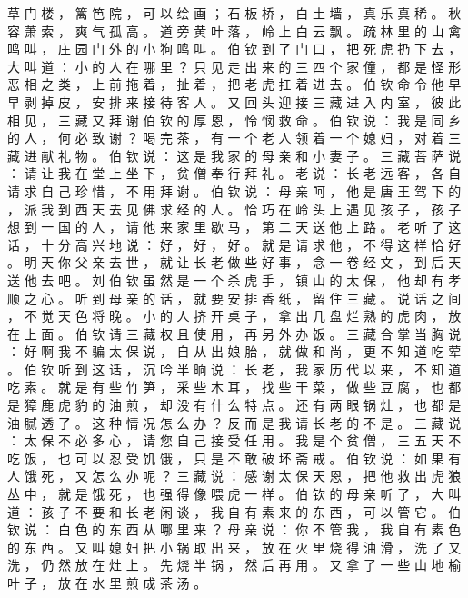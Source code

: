 {草 门 楼 ， 篱 笆 院 ， 可 以 绘 画 ； 石 板 桥 ， 白 土 墙 ， 真 乐 真 稀 。
秋 容 萧 索 ， 爽 气 孤 高 。
道 旁 黄 叶 落 ， 岭 上 白 云 飘 。
疏 林 里 的 山 禽 鸣 叫 ， 庄 园 门 外 的 小 狗 鸣 叫 。
伯 钦 到 了 门 口 ， 把 死 虎 扔 下 去 ， 大 叫 道 ： 小 的 人 在 哪 里 ？ 只 见 走 出 来 的 三 四 个 家 僮 ， 都 是 怪 形 恶 相 之 类 ， 上 前 拖 着 ， 扯 着 ， 把 老 虎 扛 着 进 去 。
伯 钦 命 令 他 早 早 剥 掉 皮 ， 安 排 来 接 待 客 人 。
又 回 头 迎 接 三 藏 进 入 内 室 ， 彼 此 相 见 ， 三 藏 又 拜 谢 伯 钦 的 厚 恩 ， 怜 悯 救 命 。
伯 钦 说 ： 我 是 同 乡 的 人 ， 何 必 致 谢 ？
喝 完 茶 ， 有 一 个 老 人 领 着 一 个 媳 妇 ， 对 着 三 藏 进 献 礼 物 。
伯 钦 说 ： 这 是 我 家 的 母 亲 和 小 妻 子 。
三 藏 菩 萨 说 ： 请 让 我 在 堂 上 坐 下 ， 贫 僧 奉 行 拜 礼 。
老 说 ： 长 老 远 客 ， 各 自 请 求 自 己 珍 惜 ， 不 用 拜 谢 。
伯 钦 说 ： 母 亲 呵 ， 他 是 唐 王 驾 下 的 ， 派 我 到 西 天 去 见 佛 求 经 的 人 。
恰 巧 在 岭 头 上 遇 见 孩 子 ， 孩 子 想 到 一 国 的 人 ， 请 他 来 家 里 歇 马 ， 第 二 天 送 他 上 路 。
老 听 了 这 话 ， 十 分 高 兴 地 说 ： 好 ， 好 ， 好 。
就 是 请 求 他 ， 不 得 这 样 恰 好 。
明 天 你 父 亲 去 世 ， 就 让 长 老 做 些 好 事 ， 念 一 卷 经 文 ， 到 后 天 送 他 去 吧 。
刘 伯 钦 虽 然 是 一 个 杀 虎 手 ， 镇 山 的 太 保 ， 他 却 有 孝 顺 之 心 。
听 到 母 亲 的 话 ， 就 要 安 排 香 纸 ， 留 住 三 藏 。
说 话 之 间 ， 不 觉 天 色 将 晚 。
小 的 人 挤 开 桌 子 ， 拿 出 几 盘 烂 熟 的 虎 肉 ， 放 在 上 面 。
伯 钦 请 三 藏 权 且 使 用 ， 再 另 外 办 饭 。
三 藏 合 掌 当 胸 说 ： 好 啊 我 不 骗 太 保 说 ， 自 从 出 娘 胎 ， 就 做 和 尚 ， 更 不 知 道 吃 荤 。
伯 钦 听 到 这 话 ， 沉 吟 半 晌 说 ： 长 老 ， 我 家 历 代 以 来 ， 不 知 道 吃 素 。
就 是 有 些 竹 笋 ， 采 些 木 耳 ， 找 些 干 菜 ， 做 些 豆 腐 ， 也 都 是 獐 鹿 虎 豹 的 油 煎 ， 却 没 有 什 么 特 点 。
还 有 两 眼 锅 灶 ， 也 都 是 油 腻 透 了 。
这 种 情 况 怎 么 办 ？ 反 而 是 我 请 长 老 的 不 是 。
三 藏 说 ： 太 保 不 必 多 心 ， 请 您 自 己 接 受 任 用 。
我 是 个 贫 僧 ， 三 五 天 不 吃 饭 ， 也 可 以 忍 受 饥 饿 ， 只 是 不 敢 破 坏 斋 戒 。
伯 钦 说 ： 如 果 有 人 饿 死 ， 又 怎 么 办 呢 ？ 三 藏 说 ： 感 谢 太 保 天 恩 ， 把 他 救 出 虎 狼 丛 中 ， 就 是 饿 死 ， 也 强 得 像 喂 虎 一 样 。
伯 钦 的 母 亲 听 了 ， 大 叫 道 ： 孩 子 不 要 和 长 老 闲 谈 ， 我 自 有 素 来 的 东 西 ， 可 以 管 它 。
伯 钦 说 ： 白 色 的 东 西 从 哪 里 来 ？ 母 亲 说 ： 你 不 管 我 ， 我 自 有 素 色 的 东 西 。
又 叫 媳 妇 把 小 锅 取 出 来 ， 放 在 火 里 烧 得 油 滑 ， 洗 了 又 洗 ， 仍 然 放 在 灶 上 。
先 烧 半 锅 ， 然 后 再 用 。
又 拿 了 一 些 山 地 榆 叶 子 ， 放 在 水 里 煎 成 茶 汤 。
}
